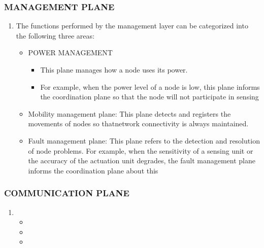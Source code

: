 \documentclass[11pt]{class}
\begin{document}
											\begin{frame}
												\frametitle{MANAGEMENT PLANE}
												\begin{enumerate}
													\item The functions performed by the management layer can be categorized into the following three areas:
													
													\begin{itemize}
														\item POWER MANAGEMENT
														\begin{itemize}
														\item This plane manages how a node uses its power. 
														\item For example, when the power level of a node is low, this plane informs the coordination plane so that the node will not participate in sensing
														\end{itemize}
														\item Mobility management plane:
														This plane detects and registers the movements of nodes so thatnetwork connectivity is always maintained.
														\item Fault management plane: 
														This plane refers to the detection and resolution of node problems.
														For example, when the sensitivity of a sensing unit or the accuracy of the actuation unit degrades, the fault management plane informs the coordination plane about this
														
													\end{itemize}
													
												\end{enumerate}
											\end{frame}
												\begin{frame}
													\frametitle{COMMUNICATION PLANE}
													\begin{enumerate}
														\item 
														\begin{itemize}
															\item  
															\item 
															\item 
														\end{itemize}
														
													\end{enumerate}
												\end{frame}
\end{document}
